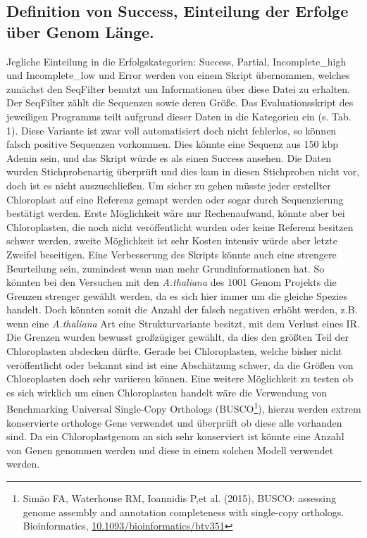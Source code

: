 \documentclass{scrartcl}
\begin{document}
\subsection{Definition von Success, Einteilung der Erfolge über Genom Länge.}
\label{sec-5-1}
Jegliche Einteilung in die Erfolgskategorien: Success, Partial, Incomplete\_high und Incomplete\_low und Error werden von einem Skript übernommen, welches zunächst den SeqFilter benutzt um Informationen über diese Datei zu erhalten. 
Der SeqFilter zählt die Sequenzen sowie deren Größe. Das Evaluationsskript des jeweiligen Programms teilt aufgrund dieser Daten in die Kategorien ein (s. Tab. 1). Diese Variante ist zwar voll automatisiert
doch nicht fehlerlos, so können falsch positive Sequenzen vorkommen. Dies könnte eine Sequenz aus 150 kbp Adenin sein, und das Skript würde es als einen Success ansehen. Die Daten wurden Stichprobenartig überprüft und dies 
kam in diesen Stichproben nicht vor, doch ist es nicht auszuschließen. Um sicher zu gehen müsste jeder erstellter Chloroplast auf eine Referenz gemapt werden oder sogar durch Sequenzierung bestätigt werden. Erste Möglichkeit
wäre nur Rechenaufwand, könnte aber bei Chloroplasten, die noch nicht veröffentlicht wurden oder keine Referenz besitzen schwer werden, zweite Möglichkeit ist sehr Kosten intensiv würde aber letzte Zweifel beseitigen. 
Eine Verbesserung des Skripts könnte auch eine strengere Beurteilung sein, zumindest wenn man mehr Grundinformationen hat. So könnten bei den Versuchen mit den \emph{A.thaliana} des 1001 Genom Projekts die Grenzen strenger gewählt werden, 
da es sich hier immer um die gleiche Spezies handelt. Doch könnten somit die Anzahl der falsch negativen erhöht werden, z.B. wenn eine \emph{A.thaliana} Art eine Strukturvariante besitzt, mit dem Verlust eines IR. Die Grenzen wurden 
bewusst großzügiger gewählt, da dies den größten Teil der Chloroplasten abdecken dürfte. Gerade bei Chloroplasten, welche bisher nicht veröffentlicht oder bekannt sind ist eine Abschätzung schwer, da die Größen von Chloroplasten
doch sehr variieren können. Eine weitere Möglichkeit zu testen ob es sich wirklich um einen Chloroplasten handelt wäre die Verwendung von Benchmarking Universal Single-Copy Orthologs (BUSCO\footnote{Simão FA, Waterhouse RM, Ioannidis P,et al. (2015), BUSCO: assessing genome assembly and annotation completeness with single-copy orthologs.  Bioinformatics, \url{10.1093/bioinformatics/btv351}}), hierzu werden extrem konservierte
orthologe Gene verwendet und überprüft ob diese alle vorhanden sind. Da ein Chloroplastgenom an sich sehr konserviert ist könnte eine Anzahl von Genen genommen werden und diese in einem solchen Modell verwendet werden. 
\end{document}
